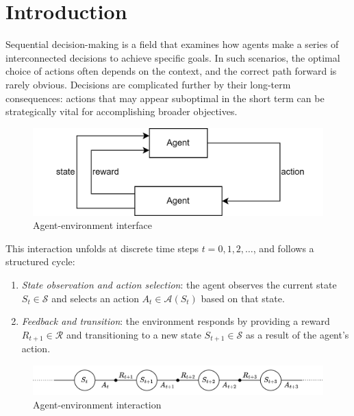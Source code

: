 \section{Introduction}

Sequential decision-making is a field that examines how agents make a series of interconnected decisions to achieve specific goals. 
In such scenarios, the optimal choice of actions often depends on the context, and the correct path forward is rarely obvious. 
Decisions are complicated further by their long-term consequences: actions that may appear suboptimal in the short term can be strategically vital for accomplishing broader objectives.
\begin{figure}[H]
    \centering
    \includegraphics[width=0.75\linewidth]{images/rl.png}
    \caption{Agent-environment interface}
\end{figure}
\noindent This interaction unfolds at discrete time steps $t = 0, 1, 2, \dots$, and follows a structured cycle:
\begin{enumerate}
    \item \textit{State observation and action selection}: the agent observes the current state $S_t \in \mathcal{S}$ and selects an action $A_t \in \mathcal{A}(S_t)$ based on that state.
    \item \textit{Feedback and transition}: the environment responds by providing a reward $R_{t+1} \in \mathcal{R}$ and transitioning to a new state $S_{t+1} \in \mathcal{S}$ as a result of the agent's action.
\end{enumerate}
\begin{figure}[H]
    \centering
    \includegraphics[width=0.75\linewidth]{images/rl1.png}
    \caption{Agent-environment interaction}
\end{figure}
